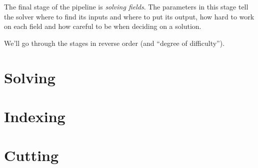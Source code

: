 \documentclass[12pt,letterpaper,titlepage]{article}
\begin{document}
The final stage of the pipeline is \emph{solving fields}.  The parameters in this stage tell the
solver where to find its inputs and where to put its output, how hard to work on each field
and how careful to be when deciding on a solution.

We'll go through the stages in reverse order (and ``degree of difficulty'').

\section{Solving}

\section{Indexing}

\section{Cutting}
\end{document}
